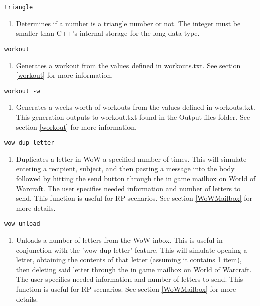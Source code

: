 \begin{lstlisting} 
triangle   
\end{lstlisting}
\begin{enumerate}
	\item[] Determines if a number is a triangle number or not. The integer must be smaller than C++'s internal storage for the long data type.
\end{enumerate}

\begin{lstlisting} 
workout
\end{lstlisting}
\begin{enumerate}
	\item[] Generates a workout from the values defined in workouts.txt. See section \ref{workout} for more information.
\end{enumerate}

\begin{lstlisting} 
workout -w
\end{lstlisting}
\begin{enumerate}
	\item[] Generates a weeks worth of workouts from the values defined in workouts.txt. This generation outputs to workout.txt found in the Output files folder. See section \ref{workout} for more information.
\end{enumerate}

\begin{lstlisting} 
wow dup letter
\end{lstlisting}
\begin{enumerate}
	\item[] Duplicates a letter in WoW a specified number of times. This will simulate entering a recipient, subject, and then pasting a message into the body followed by hitting the send button through the in game mailbox on World of Warcraft. The user specifies needed information and number of letters to send. This function is useful for RP scenarios. See section \ref{WoWMailbox} for more details.
\end{enumerate}

\begin{lstlisting} 
wow unload
\end{lstlisting}
\begin{enumerate}
	\item[] Unloads a number of letters from the WoW inbox. This is useful in conjunction with the 'wow dup letter' feature. This will simulate opening a letter, obtaining the contents of that letter (assuming it contains 1 item), then deleting said letter through the in game mailbox on World of Warcraft. The user specifies needed information and number of letters to send. This function is useful for RP scenarios. See section \ref{WoWMailbox} for more details.
\end{enumerate}


